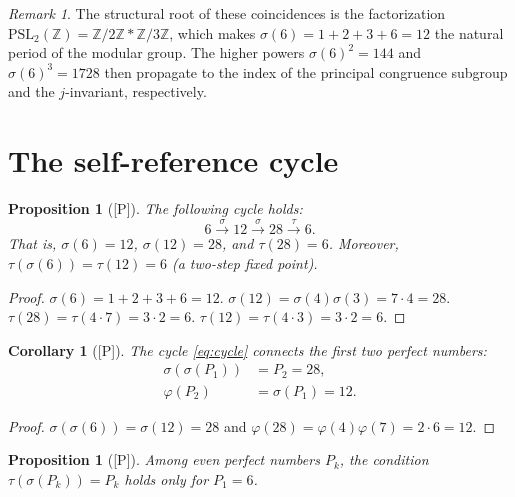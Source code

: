 \documentclass[11pt,letterpaper]{article}
\newtheorem{proposition}[theorem]{Proposition}
\newtheorem{corollary}[theorem]{Corollary}
\theoremstyle{definition}
\theoremstyle{remark}
\newtheorem*{remark}{Remark}
\newcommand{\ZZ}{\mathbb{Z}}
\newcommand{\proven}{\textsf{[P]}}
\begin{document}
\begin{remark}
The structural root of these coincidences is the factorization 
$\mathrm{PSL}_2(\ZZ) = \ZZ/2\ZZ * \ZZ/3\ZZ$, which makes 
$\sigma(6) = 1 + 2 + 3 + 6 = 12$ the natural period of the modular group.
The higher powers $\sigma(6)^2 = 144$ and $\sigma(6)^3 = 1728$ then 
propagate to the index of the principal congruence subgroup and the 
$j$-invariant, respectively.
\end{remark}

\section{The self-reference cycle}
\label{sec:self-ref}

\begin{proposition}[\proven]\label{prop:self-ref}
The following cycle holds:
\begin{equation}\label{eq:cycle}
6 \xrightarrow{\;\sigma\;} 12 \xrightarrow{\;\sigma\;} 28 \xrightarrow{\;\tau\;} 6.
\end{equation}
That is, $\sigma(6) = 12$, $\sigma(12) = 28$, and $\tau(28) = 6$.
Moreover, $\tau(\sigma(6)) = \tau(12) = 6$ (a two-step fixed point).
\end{proposition}

\begin{proof}
$\sigma(6) = 1+2+3+6 = 12$. 
$\sigma(12) = \sigma(4)\sigma(3) = 7 \cdot 4 = 28$.
$\tau(28) = \tau(4 \cdot 7) = 3 \cdot 2 = 6$.
$\tau(12) = \tau(4 \cdot 3) = 3 \cdot 2 = 6$.
\end{proof}

\begin{corollary}[\proven]\label{cor:cycle-extras}
The cycle \eqref{eq:cycle} connects the first two perfect numbers:
\begin{align}
\sigma(\sigma(P_1)) &= P_2 = 28, \\
\varphi(P_2) &= \sigma(P_1) = 12.
\end{align}
\end{corollary}

\begin{proof}
$\sigma(\sigma(6)) = \sigma(12) = 28$ and $\varphi(28) = \varphi(4)\varphi(7) = 2\cdot 6 = 12$.
\end{proof}

\begin{proposition}[\proven]\label{prop:cycle-unique}
Among even perfect numbers $P_k$, the condition $\tau(\sigma(P_k)) = P_k$ 
holds only for $P_1 = 6$.
\end{proposition}
\end{document}
